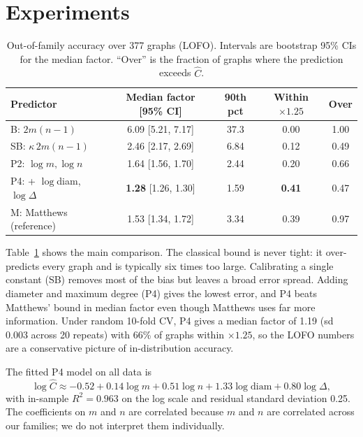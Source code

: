 \documentclass{article}
\begin{document}
\section{Experiments}
\begin{table}[t]
\caption{Out-of-family accuracy over 377 graphs (LOFO). Intervals are bootstrap 95\% CIs for the median factor. ``Over'' is the fraction of graphs where the prediction exceeds $\hat C$.}
\label{tab:main}
\begin{center}
\small
\begin{tabular}{lcccc}
\toprule
Predictor & Median factor [95\% CI] & 90th pct & Within $\times1.25$ & Over \\
\midrule
B: $2m(n-1)$ & 6.09 [5.21, 7.17] & 37.3 & 0.00 & 1.00 \\
SB: $\kappa\,2m(n-1)$ & 2.46 [2.17, 2.69] & 6.84 & 0.12 & 0.49 \\
P2: $\log m,\log n$ & 1.64 [1.56, 1.70] & 2.44 & 0.20 & 0.66 \\
P4: + $\log$diam, $\log\Delta$ & \textbf{1.28} [1.26, 1.30] & 1.59 & \textbf{0.41} & 0.47 \\
M: Matthews (reference) & 1.53 [1.34, 1.72] & 3.34 & 0.39 & 0.97 \\
\bottomrule
\end{tabular}
\end{center}
\vskip -0.1in
\end{table}

Table~\ref{tab:main} shows the main comparison. The classical bound is never tight: it over-predicts every graph and is typically six times too large. Calibrating a single constant (SB) removes most of the bias but leaves a broad error spread. Adding diameter and maximum degree (P4) gives the lowest error, and P4 beats Matthews' bound in median factor even though Matthews uses far more information. Under random 10-fold CV, P4 gives a median factor of 1.19 (sd 0.003 across 20 repeats) with 66\% of graphs within $\times1.25$, so the LOFO numbers are a conservative picture of in-distribution accuracy.

The fitted P4 model on all data is
\[
\log \hat C \approx -0.52 + 0.14\log m + 0.51\log n + 1.33\log\mathrm{diam} + 0.80\log\Delta,
\]
with in-sample $R^2=0.963$ on the log scale and residual standard deviation 0.25. The coefficients on $m$ and $n$ are correlated because $m$ and $n$ are correlated across our families; we do not interpret them individually.
\end{document}
